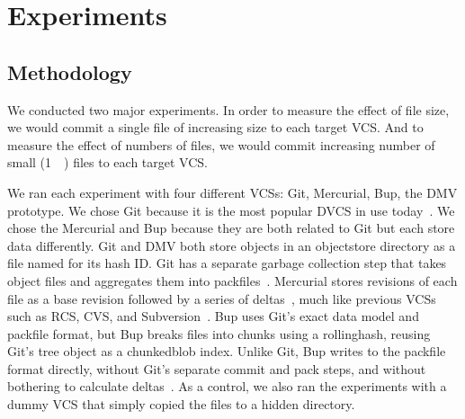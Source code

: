 \section{Experiments}




\subsection{Methodology}

We conducted two major experiments.
In order to measure the effect of file size, we would \gls{commit} a single file of increasing size to each target \gls{VCS}.
And to measure the effect of numbers of files, we would \gls{commit} increasing number of small (\SI{1}{\kibi\byte}) files to each target \gls{VCS}.

We ran each experiment with four different \glspl{VCS}: Git, Mercurial, Bup, the DMV prototype.
We chose Git because it is the most popular \gls{DVCS} in use today~\cite{what_are_devs_talking_about}.
We chose the Mercurial and Bup because they are both related to Git but each store data differently.
Git and DMV both store objects in an \gls{objectstore} directory as a file named for its hash ID.
Git has a separate garbage collection step that takes object files and aggregates them into \glspl{packfile}~\cite[Section 10.7]{git_book}.
Mercurial stores revisions of each file as a base revision followed by a series of deltas~\cite[Chapter 4]{hgbook}, much like previous \glspl{VCS} such as RCS, CVS, and Subversion~\cite{history_of_version_control}.
Bup uses Git's exact data model and \gls{packfile} format, but Bup breaks files into chunks using a \gls{rollinghash}, reusing Git's \gls{tree} object as a \gls{chunkedblob} index\footnotemark.
Unlike Git, Bup writes to the \gls{packfile} format directly, without Git's separate commit and pack steps, and without bothering to calculate deltas~\cite{bup_design}.
As a control, we also ran the experiments with a dummy \gls{VCS} that simply copied the files to a hidden directory.


